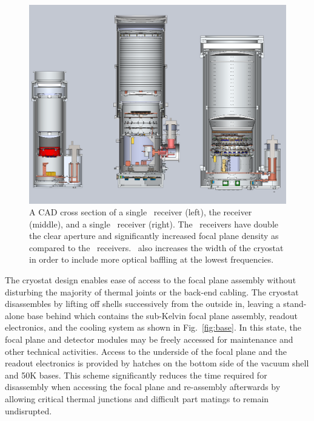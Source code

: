 \documentclass[]{spie}  %
\begin{document}
\begin{figure} [hb]
	\begin{center}
		\includegraphics[scale=0.35]{BA_B3_spud.PDF}
	\end{center}
	\caption{A CAD cross section of a single \keckarray\ receiver (left), the
	 receiver (middle), and a single
	\biceparray\ receiver (right). The \biceparray\ receivers have double
	the clear aperture and significantly increased focal plane density as
	compared to the \keckarray\ receivers. \biceparray\ also increases the
	width of the cryostat in order to include more optical baffling at the
	lowest frequencies.}
	\label{fig:bavskeck}
\end{figure}







The cryostat design enables ease of access to the focal plane assembly without
disturbing the majority of thermal joints or the back-end cabling. The
cryostat disassembles by lifting off shells successively
from the outside in, leaving a stand-alone base behind which contains the
sub-Kelvin focal plane assembly, readout electronics, and the cooling system as shown in
Fig.~\ref{fig:base}. In this state, the focal plane and detector modules may be
freely accessed for maintenance and other technical activities. Access to the
underside of the focal plane and the readout electronics is provided by
hatches on the bottom side of the vacuum shell and 50K bases. This scheme
significantly reduces the time required for disassembly when accessing the
focal plane and re-assembly afterwards by allowing critical thermal junctions
and difficult part matings to remain undisrupted.
\end{document}
